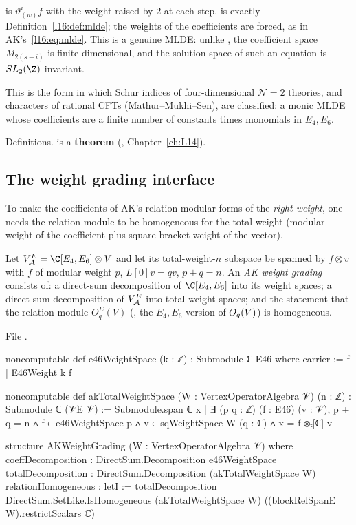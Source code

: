 \begin{dictionary}
 is $\vartheta^i_{(w)}f$ with the weight raised by $2$ at each step.  is exactly
Definition~\ref{l16:def:mlde}; the weights of the coefficients are forced, as in AK's~\eqref{l16:eq:mlde}. This is a
genuine MLDE: unlike , the coefficient space $M_{2(s-i)}$ is finite-dimensional, and the solution space of
such an equation is $SL_2(\Z)$-invariant.
\end{dictionary}

\begin{physics}
This is the form in which Schur indices of four-dimensional $\mathcal N=2$ theories, and characters of rational CFTs
(Mathur--Mukhi--Sen), are classified: a monic MLDE whose coefficients are a finite number of constants times monomials
in $E_4,E_6$.
\end{physics}

\begin{status}
Definitions.  is a \textbf{theorem} (, Chapter~\ref{ch:L14}).
\end{status}

\subsection{The weight grading interface}

To make the coefficients of AK's relation modular forms of the \emph{right weight}, one needs the relation module to be
homogeneous for the total weight (modular weight of the coefficient plus square-bracket weight of the vector).

\begin{definition}\label{l16:def:akgrading}
Let $\lsixteenVA^{E} = \C[E_4,E_6]\otimes V$ and let its total-weight-$n$ subspace be spanned by $f\otimes v$ with $f$ of
modular weight $p$, $L[0]v = qv$, $p+q=n$. An \emph{AK weight grading} consists of: a direct-sum decomposition of $\C[E_4,E_6]$
into its weight spaces; a direct-sum decomposition of $V_{\mathcal A}^E$ into total-weight spaces; and the statement that the
relation module $O^E_q(V)$ (, the $E_4,E_6$-version of $O_q(V)$) is homogeneous.
\end{definition}
\noindent File .
\begin{leancode}
noncomputable def e46WeightSpace (k : ℤ) : Submodule ℂ E46 where
  carrier := {f | E46Weight k f}

noncomputable def akTotalWeightSpace (W : VertexOperatorAlgebra 𝒱) (n : ℤ) :
    Submodule ℂ (𝒱E 𝒱) :=
  Submodule.span ℂ {x | ∃ (p q : ℤ) (f : E46) (v : 𝒱), p + q = n ∧
    f ∈ e46WeightSpace p ∧ v ∈ sqWeightSpace W (q : ℂ) ∧ x = f ⊗ₜ[ℂ] v}

structure AKWeightGrading (W : VertexOperatorAlgebra 𝒱) where
  coeffDecomposition : DirectSum.Decomposition e46WeightSpace
  totalDecomposition : DirectSum.Decomposition (akTotalWeightSpace W)
  relationHomogeneous :
    letI := totalDecomposition
    DirectSum.SetLike.IsHomogeneous (akTotalWeightSpace W)
      ((blockRelSpanE W).restrictScalars ℂ)
\end{leancode}

